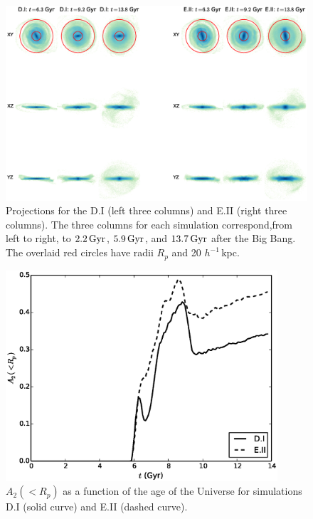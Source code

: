 \begin{figure}
	\centering
	\includegraphics[width=\textwidth]{../figures/cosmo_three_by_threes.eps}
	\caption{Projections for the D.I (left three columns) and E.II
          (right three columns).  The three columns for each
          simulation correspond,from left to right, to $2.2\,{\rm
            Gyr}$, $5.9\,{\rm Gyr}$, and $13.7\,{\rm Gyr}$ after the
          Big Bang. The overlaid red circles have radii $R_p$ and 20
          $h^{-1} \,$kpc.} \label{fig:face_on_cosmo}
\end{figure}

\begin{figure}
	\centering
	\includegraphics[width=0.9\textwidth]{../figures/cosmo_a2_vs_t_2rd_weighted.eps}
	\caption{$A_2(<R_p)$ as a function of the age of the Universe
          for simulations D.I (solid curve) and E.II (dashed
          curve). } \label{fig:cosmo_a2_vs_t}
\end{figure}



